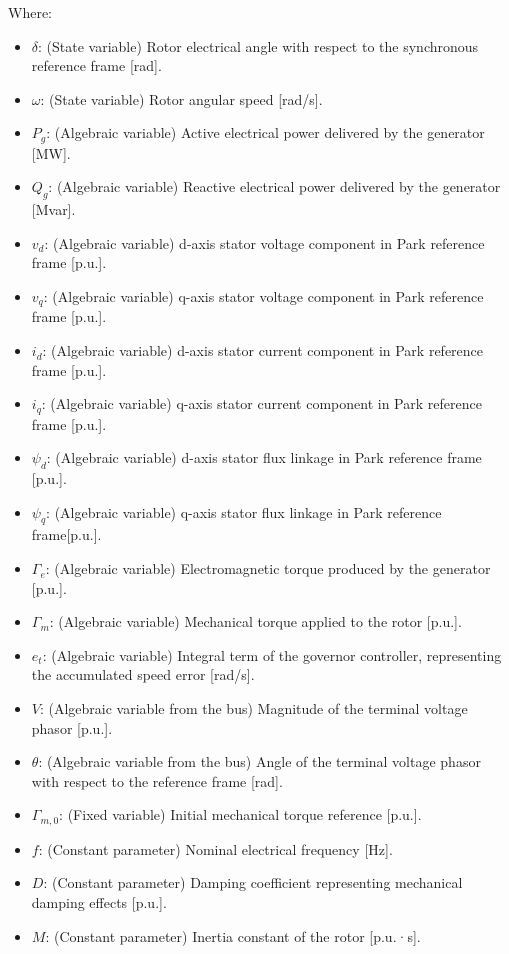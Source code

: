 \begin{itemize}
Where:
\begin{itemize}
  \item $\delta$: (State variable) Rotor electrical angle with respect to the synchronous reference frame [rad].
  \item $\omega$: (State variable) Rotor angular speed [rad/s].
  \item $P_g$: (Algebraic variable) Active electrical power delivered by the generator [MW].
  \item $Q_g$: (Algebraic variable) Reactive electrical power delivered by the generator [Mvar].
  \item $v_d$: (Algebraic variable) d-axis stator voltage component in Park reference frame [p.u.].
  \item $v_q$: (Algebraic variable) q-axis stator voltage component in Park reference frame [p.u.].
  \item $i_d$: (Algebraic variable) d-axis stator current component in Park reference frame [p.u.].
  \item $i_q$: (Algebraic variable) q-axis stator current component in Park reference frame [p.u.].
  \item $\psi_d$: (Algebraic variable) d-axis stator flux linkage in Park reference frame [p.u.].
  \item $\psi_q$: (Algebraic variable) q-axis stator flux linkage in Park reference frame[p.u.].
  \item $\Gamma_e$: (Algebraic variable) Electromagnetic torque produced by the generator [p.u.].
  \item $\Gamma_m$: (Algebraic variable) Mechanical torque applied to the rotor [p.u.].
  \item $e_t$: (Algebraic variable) Integral term of the governor controller, representing the accumulated speed error [rad/s].
  \item $V$: (Algebraic variable from the bus) Magnitude of the terminal voltage phasor [p.u.].
  \item $\theta$: (Algebraic variable from the bus) Angle of the terminal voltage phasor with respect to the reference frame [rad].
  \item $\Gamma_{m,0}$: (Fixed variable) Initial mechanical torque reference [p.u.].
  \item $f$: (Constant parameter) Nominal electrical frequency [Hz].
  \item $D$: (Constant parameter) Damping coefficient representing mechanical damping effects [p.u.].
  \item $M$: (Constant parameter) Inertia constant of the rotor [p.u.·s].

\end{itemize}
\end{itemize}
